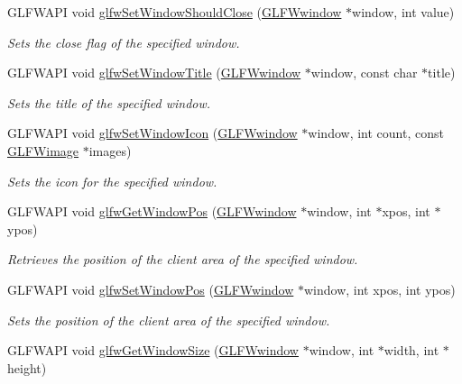 \begin{DoxyCompactItemize}
G\+L\+F\+W\+A\+PI void \hyperlink{group__window_ga1cadeda7a1e2f224e06a8415d30741aa}{glfw\+Set\+Window\+Should\+Close} (\hyperlink{group__window_ga3c96d80d363e67d13a41b5d1821f3242}{G\+L\+F\+Wwindow} $\ast$window, int value)
\begin{DoxyCompactList}\small\item\em Sets the close flag of the specified window. \end{DoxyCompactList}\item 
G\+L\+F\+W\+A\+PI void \hyperlink{group__window_ga861ed3414ab8120e2f74151a666ed1dc}{glfw\+Set\+Window\+Title} (\hyperlink{group__window_ga3c96d80d363e67d13a41b5d1821f3242}{G\+L\+F\+Wwindow} $\ast$window, const char $\ast$title)
\begin{DoxyCompactList}\small\item\em Sets the title of the specified window. \end{DoxyCompactList}\item 
G\+L\+F\+W\+A\+PI void \hyperlink{group__window_ga182987a1a62a41a924842b9473d560df}{glfw\+Set\+Window\+Icon} (\hyperlink{group__window_ga3c96d80d363e67d13a41b5d1821f3242}{G\+L\+F\+Wwindow} $\ast$window, int count, const \hyperlink{structGLFWimage}{G\+L\+F\+Wimage} $\ast$images)
\begin{DoxyCompactList}\small\item\em Sets the icon for the specified window. \end{DoxyCompactList}\item 
G\+L\+F\+W\+A\+PI void \hyperlink{group__window_ga0076a8591ef7494d359730cf2250b45b}{glfw\+Get\+Window\+Pos} (\hyperlink{group__window_ga3c96d80d363e67d13a41b5d1821f3242}{G\+L\+F\+Wwindow} $\ast$window, int $\ast$xpos, int $\ast$ypos)
\begin{DoxyCompactList}\small\item\em Retrieves the position of the client area of the specified window. \end{DoxyCompactList}\item 
G\+L\+F\+W\+A\+PI void \hyperlink{group__window_ga0dc8d880a0d87be16d3ea8114561f6f0}{glfw\+Set\+Window\+Pos} (\hyperlink{group__window_ga3c96d80d363e67d13a41b5d1821f3242}{G\+L\+F\+Wwindow} $\ast$window, int xpos, int ypos)
\begin{DoxyCompactList}\small\item\em Sets the position of the client area of the specified window. \end{DoxyCompactList}\item 
G\+L\+F\+W\+A\+PI void \hyperlink{group__window_ga7feb769ebb3f3d21579b5a3fb07be76e}{glfw\+Get\+Window\+Size} (\hyperlink{group__window_ga3c96d80d363e67d13a41b5d1821f3242}{G\+L\+F\+Wwindow} $\ast$window, int $\ast$width, int $\ast$height)

\end{DoxyCompactItemize}
